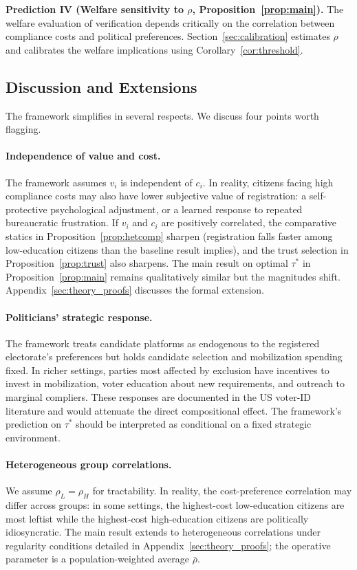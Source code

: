 \textbf{Prediction IV (Welfare sensitivity to $\rho$, Proposition~\ref{prop:main}).} The welfare evaluation of verification depends critically on the correlation between compliance costs and political preferences. Section~\ref{sec:calibration} estimates $\rho$ and calibrates the welfare implications using Corollary~\ref{cor:threshold}.

\subsection{Discussion and Extensions}
\label{ssec:discussion}

The framework simplifies in several respects. We discuss four points worth flagging.

\paragraph{Independence of value and cost.} The framework assumes $v_i$ is independent of $c_i$. In reality, citizens facing high compliance costs may also have lower subjective value of registration: a self-protective psychological adjustment, or a learned response to repeated bureaucratic frustration. If $v_i$ and $c_i$ are positively correlated, the comparative statics in Proposition~\ref{prop:hetcomp} sharpen (registration falls faster among low-education citizens than the baseline result implies), and the trust selection in Proposition~\ref{prop:trust} also sharpens. The main result on optimal $\tau^*$ in Proposition~\ref{prop:main} remains qualitatively similar but the magnitudes shift. Appendix~\ref{sec:theory_proofs} discusses the formal extension.

\paragraph{Politicians' strategic response.} The framework treats candidate platforms as endogenous to the registered electorate's preferences but holds candidate selection and mobilization spending fixed. In richer settings, parties most affected by exclusion have incentives to invest in mobilization, voter education about new requirements, and outreach to marginal compliers. These responses are documented in the US voter-ID literature and would attenuate the direct compositional effect. The framework's prediction on $\tau^*$ should be interpreted as conditional on a fixed strategic environment.

\paragraph{Heterogeneous group correlations.} We assume $\rho_L = \rho_H$ for tractability. In reality, the cost-preference correlation may differ across groups: in some settings, the highest-cost low-education citizens are most leftist while the highest-cost high-education citizens are politically idiosyncratic. The main result extends to heterogeneous correlations under regularity conditions detailed in Appendix~\ref{sec:theory_proofs}; the operative parameter is a population-weighted average $\bar\rho$.

